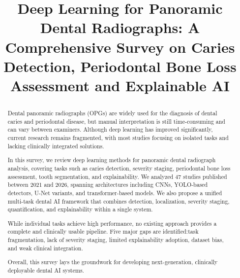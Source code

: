 \documentclass[conference]{IEEEtran}
\begin{document}
\title{Deep Learning for Panoramic Dental Radiographs: A Comprehensive
Survey on Caries Detection, Periodontal Bone Loss Assessment and
Explainable AI%

}

\author{
\and
{}
\and
{}
\and
{}
\and
{}
}
\maketitle

\begin{abstract}
Dental panoramic radiographs (OPGs) are widely used for the diagnosis of dental caries and periodontal disease, but manual interpretation is still time-consuming and can vary between examiners.  Although deep learning has improved significantly, current research remains fragmented, with most studies focusing on isolated tasks and lacking clinically integrated solutions.

In this survey, we review deep learning methods for panoramic dental radiograph analysis, covering tasks such as caries detection, severity staging, periodontal bone loss assessment, tooth segmentation, and explainability. We analyzed 47 studies published between 2021 and 2026, spanning architectures including CNNs, YOLO-based detectors, U-Net variants, and transformer-based models. We also propose a unified multi-task dental AI framework that combines detection, localization, severity staging, quantification, and explainability within a single system.

While individual tasks achieve high performance, no existing approach provides a complete and clinically usable pipeline. Five major gaps are identified:task fragmentation, lack of severity staging, limited explainability adoption, dataset bias, and weak clinical integration.

Overall, this survey lays the groundwork for developing next-generation, clinically deployable dental AI systems.
\end{abstract}
\end{document}
